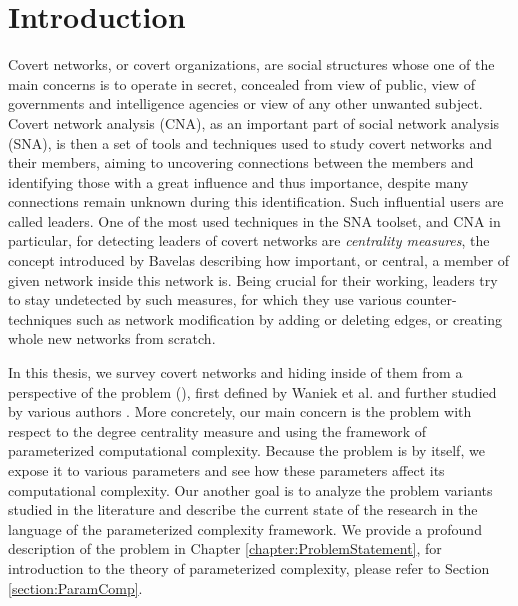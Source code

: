 \chapter*{Introduction}

\setcounter{page}{1}

Covert networks, or covert organizations, are social structures whose one of the main concerns is to operate in secret,
concealed from view of public, view of governments and intelligence agencies or view of any other unwanted subject.
Covert network analysis (CNA), as an important part of social network analysis (SNA),
is then a set of tools and techniques used to study covert networks and their members,
aiming to uncovering connections between the members and identifying those with a great
influence and thus importance, despite many connections remain unknown during this identification.
Such influential users are called leaders.
One of the most used techniques in the SNA toolset, and CNA in particular, for detecting leaders of covert networks
are \emph{centrality measures},
the concept introduced by Bavelas \cite{Bavelas1948} describing how important, or central,
a member of given network inside this network is.
Being crucial for their working, leaders try to stay undetected by such measures,
for which they use various counter-techniques such as
network modification by adding or deleting edges, or creating whole new networks from scratch.

In this thesis, we survey covert networks and hiding inside of them from a perspective of the \HL problem (\HLshort), first defined by
Waniek et al. \cite{Waniek2017} and further studied by various authors \cite{Dey2019,Waniek2021,Mohan2023}.
More concretely, our main concern is the \HL problem with respect to the degree centrality measure
and using the framework of parameterized computational complexity.
Because the problem is \NPh by itself, we expose it to various parameters and
see how these parameters affect its computational complexity.
Our another goal is to analyze the problem variants studied in the literature
and describe the current state of the research in the language of the parameterized complexity framework.
We provide a profound description of the \HL problem in Chapter \ref{chapter:ProblemStatement}, for introduction to
the theory of parameterized complexity, please refer to Section \ref{section:ParamComp}.
